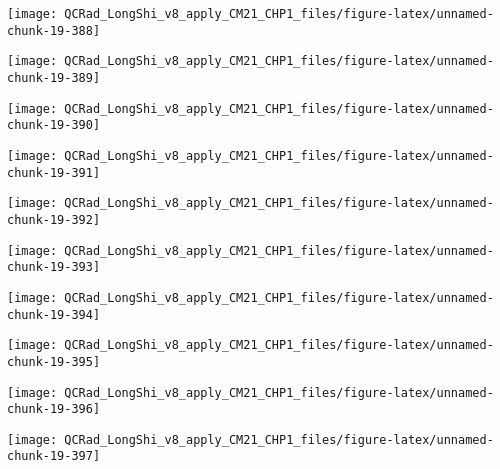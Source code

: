 \documentclass[
  10pt,
  a4paper,oneside]{article}
\begin{document}
\begin{center}\texttt{[image: QCRad\_LongShi\_v8\_apply\_CM21\_CHP1\_files/figure-latex/unnamed-chunk-19-388]} \end{center}

\begin{center}\texttt{[image: QCRad\_LongShi\_v8\_apply\_CM21\_CHP1\_files/figure-latex/unnamed-chunk-19-389]} \end{center}

\begin{center}\texttt{[image: QCRad\_LongShi\_v8\_apply\_CM21\_CHP1\_files/figure-latex/unnamed-chunk-19-390]} \end{center}

\begin{center}\texttt{[image: QCRad\_LongShi\_v8\_apply\_CM21\_CHP1\_files/figure-latex/unnamed-chunk-19-391]} \end{center}

\begin{center}\texttt{[image: QCRad\_LongShi\_v8\_apply\_CM21\_CHP1\_files/figure-latex/unnamed-chunk-19-392]} \end{center}

\begin{center}\texttt{[image: QCRad\_LongShi\_v8\_apply\_CM21\_CHP1\_files/figure-latex/unnamed-chunk-19-393]} \end{center}

\begin{center}\texttt{[image: QCRad\_LongShi\_v8\_apply\_CM21\_CHP1\_files/figure-latex/unnamed-chunk-19-394]} \end{center}

\begin{center}\texttt{[image: QCRad\_LongShi\_v8\_apply\_CM21\_CHP1\_files/figure-latex/unnamed-chunk-19-395]} \end{center}

\begin{center}\texttt{[image: QCRad\_LongShi\_v8\_apply\_CM21\_CHP1\_files/figure-latex/unnamed-chunk-19-396]} \end{center}

\begin{center}\texttt{[image: QCRad\_LongShi\_v8\_apply\_CM21\_CHP1\_files/figure-latex/unnamed-chunk-19-397]} \end{center}
\end{document}
